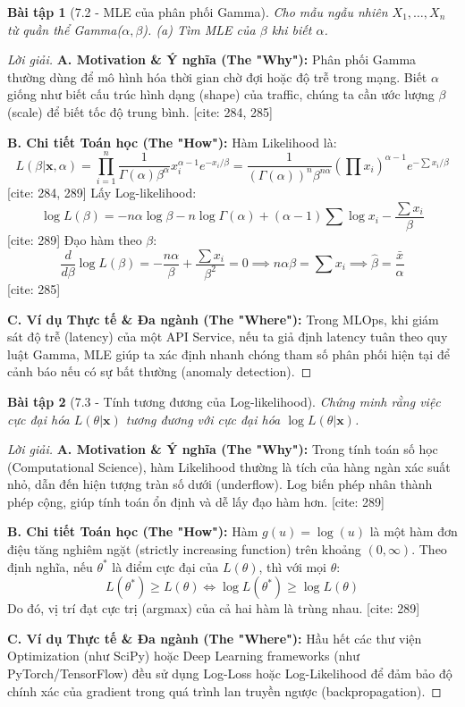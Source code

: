 \documentclass[8pt,a4paper]{article}
\newtheorem{exercise}{Bài tập}
\newenvironment{solution}{\begin{proof}[Lời giải]}{\end{proof}}
\begin{document}
\begin{exercise}[7.2 - MLE của phân phối Gamma]
Cho mẫu ngẫu nhiên $X_1, \dots, X_n$ từ quần thể Gamma($\alpha, \beta$).
(a) Tìm MLE của $\beta$ khi biết $\alpha$.
\end{exercise}

\begin{solution}
\textbf{A. Motivation \& Ý nghĩa (The "Why"):} Phân phối Gamma thường dùng để mô hình hóa thời gian chờ đợi hoặc độ trễ trong mạng. Biết $\alpha$ giống như biết cấu trúc hình dạng (shape) của traffic, chúng ta cần ước lượng $\beta$ (scale) để biết tốc độ trung bình. [cite: 284, 285]

\textbf{B. Chi tiết Toán học (The "How"):}
Hàm Likelihood là:
\[ L(\beta | \mathbf{x}, \alpha) = \prod_{i=1}^n \frac{1}{\Gamma(\alpha)\beta^\alpha} x_i^{\alpha-1} e^{-x_i/\beta} = \frac{1}{(\Gamma(\alpha))^n \beta^{n\alpha}} \left(\prod x_i\right)^{\alpha-1} e^{-\sum x_i/\beta} \] [cite: 284, 289]
Lấy Log-likelihood:
\[ \log L(\beta) = -n\alpha \log \beta - n \log \Gamma(\alpha) + (\alpha-1) \sum \log x_i - \frac{\sum x_i}{\beta} \] [cite: 289]
Đạo hàm theo $\beta$:
\[ \frac{d}{d\beta} \log L(\beta) = -\frac{n\alpha}{\beta} + \frac{\sum x_i}{\beta^2} = 0 \implies n\alpha\beta = \sum x_i \implies \hat{\beta} = \frac{\bar{x}}{\alpha} \] [cite: 285]

\textbf{C. Ví dụ Thực tế \& Đa ngành (The "Where"):} Trong MLOps, khi giám sát độ trễ (latency) của một API Service, nếu ta giả định latency tuân theo quy luật Gamma, MLE giúp ta xác định nhanh chóng tham số phân phối hiện tại để cảnh báo nếu có sự bất thường (anomaly detection).
\end{solution}

\begin{exercise}[7.3 - Tính tương đương của Log-likelihood]
Chứng minh rằng việc cực đại hóa $L(\theta | \mathbf{x})$ tương đương với cực đại hóa $\log L(\theta | \mathbf{x})$.
\end{exercise}

\begin{solution}
\textbf{A. Motivation \& Ý nghĩa (The "Why"):} Trong tính toán số học (Computational Science), hàm Likelihood thường là tích của hàng ngàn xác suất nhỏ, dẫn đến hiện tượng tràn số dưới (underflow). Log biến phép nhân thành phép cộng, giúp tính toán ổn định và dễ lấy đạo hàm hơn. [cite: 289]

\textbf{B. Chi tiết Toán học (The "How"):}
Hàm $g(u) = \log(u)$ là một hàm đơn điệu tăng nghiêm ngặt (strictly increasing function) trên khoảng $(0, \infty)$. 
Theo định nghĩa, nếu $\theta^*$ là điểm cực đại của $L(\theta)$, thì với mọi $\theta$:
\[ L(\theta^*) \ge L(\theta) \iff \log L(\theta^*) \ge \log L(\theta) \]
Do đó, vị trí đạt cực trị (argmax) của cả hai hàm là trùng nhau. [cite: 289]

\textbf{C. Ví dụ Thực tế \& Đa ngành (The "Where"):} Hầu hết các thư viện Optimization (như SciPy) hoặc Deep Learning frameworks (như PyTorch/TensorFlow) đều sử dụng Log-Loss hoặc Log-Likelihood để đảm bảo độ chính xác của gradient trong quá trình lan truyền ngược (backpropagation).
\end{solution}
\end{document}
